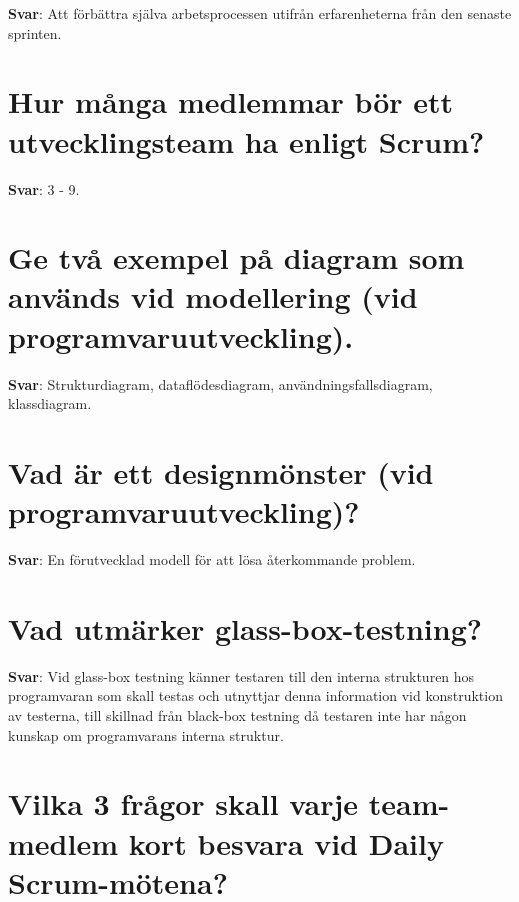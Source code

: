 \documentclass[a4paper,11pt,oneside]{book}
\begin{document}
\begin{sloppypar}
\textbf{Svar}: Att f\"orb\"attra sj\"alva arbetsprocessen utifr\r{a}n erfarenheterna fr\r{a}n den senaste sprinten.



\section{Hur m\r{a}nga medlemmar b\"or ett utvecklingsteam ha enligt Scrum?}

\label{q:244:sa:sv:True}

\textbf{Svar}: 3 - 9.



\section{Ge tv\r{a} exempel p\r{a} diagram som anv\"ands vid modellering (vid programvaruutveckling).}

\label{q:245:sa:sv:True}

\textbf{Svar}: Strukturdiagram, datafl\"odesdiagram, anv\"andningsfallsdiagram, klassdiagram.



\section{Vad \"ar ett designm\"onster (vid programvaruutveckling)?}

\label{q:246:sa:sv:True}

\textbf{Svar}: En f\"orutvecklad modell f\"or att l\"osa \r{a}terkommande problem.



\section{Vad utm\"arker glass-box-testning?}

\label{q:247:sa:sv:True}

\textbf{Svar}: Vid glass-box testning k\"anner testaren till den interna strukturen hos programvaran som skall testas och utnyttjar denna information vid konstruktion av testerna, till skillnad fr\r{a}n black-box testning d\r{a} testaren inte har n\r{a}gon kunskap om programvarans interna struktur.



\section{Vilka 3 fr\r{a}gor skall varje team-medlem kort besvara vid Daily Scrum-m\"otena?}


\end{sloppypar}
\end{document}
